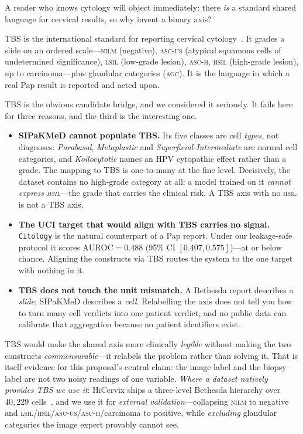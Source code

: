 \documentclass[sigplan,nonacm,screen]{acmart}
\begin{document}
A reader who knows cytology will object immediately: there \emph{is} a standard shared language for cervical results, so why invent a binary axis?

\begin{defbox}
TBS is the international standard for reporting cervical cytology~\cite{nayar2015pap}. It grades a slide on an ordered scale---\textsc{nilm} (negative), \textsc{asc-us} (atypical squamous cells of undetermined significance), \textsc{lsil} (low-grade lesion), \textsc{asc-h}, \textsc{hsil} (high-grade lesion), up to carcinoma---plus glandular categories (\textsc{agc}). It is the language in which a real Pap result is reported and acted upon.
\end{defbox}

TBS is the obvious candidate bridge, and we considered it seriously. It fails here for three reasons, and the third is the interesting one.

\begin{itemize}
  \item \textbf{SIPaKMeD cannot populate TBS.} Its five classes are cell \emph{types}, not diagnoses: \emph{Parabasal}, \emph{Metaplastic} and \emph{Superficial-Intermediate} are normal cell categories, and \emph{Koilocytotic} names an HPV cytopathic effect rather than a grade. The mapping to TBS is one-to-many at the fine level. Decisively, the dataset contains no high-grade category at all: a model trained on it \emph{cannot express \textsc{hsil}}---the grade that carries the clinical risk. A TBS axis with no \textsc{hsil} is not a TBS axis.
  \item \textbf{The UCI target that would align with TBS carries no signal.} \texttt{Citology} is the natural counterpart of a Pap report. Under our leakage-safe protocol it scores $\mathrm{AUROC}=0.488$ (95\% CI $[0.407,0.575]$)---at or below chance. Aligning the constructs via TBS routes the system to the one target with nothing in it.
  \item \textbf{TBS does not touch the unit mismatch.} A Bethesda report describes a \emph{slide}; SIPaKMeD describes a \emph{cell}. Relabelling the axis does not tell you how to turn many cell verdicts into one patient verdict, and no public data can calibrate that aggregation because no patient identifiers exist.
\end{itemize}

\begin{keybox}
TBS would make the shared axis more clinically \emph{legible} without making the two constructs \emph{commensurable}---it relabels the problem rather than solving it. That is itself evidence for this proposal's central claim: the image label and the biopsy label are not two noisy readings of one variable. \emph{Where a dataset natively provides TBS we use it}: HiCervix ships a three-level Bethesda hierarchy over $40{,}229$ cells~\cite{cai2024hicervix}, and we use it for \emph{external validation}---collapsing \textsc{nilm} to negative and \textsc{lsil}/\textsc{hsil}/\textsc{asc-us}/\textsc{asc-h}/carcinoma to positive, while \emph{excluding} glandular categories the image expert provably cannot see.
\end{keybox}
\end{document}
